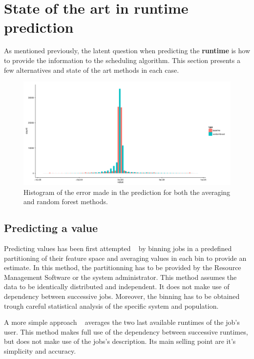 \documentclass{article}
\begin{document}
\section{State of the art in \textbf{runtime} prediction}

As mentioned previously, the latent question when predicting the \textbf{runtime} is how to provide the information to the scheduling algorithm. This section presents a few alternatives and state of the art methods in each case.

\begin{figure}[b]
  \centering
  \includegraphics[width=\textwidth]{../../truc.png}
  \caption{Histogram of the error made in the prediction for both the averaging and random forest methods.}
  \label{fig:ratio}
\end{figure}


\subsection{Predicting a value}
\label{sub:predicting_a_value}

Predicting values has been first attempted ~\cite{gibbons} by binning jobs in a predefined partitioning of their feature space and averaging values in each bin to provide an estimate. In this method, the partitionning has to be provided by the Resource Management Software or the system administrator. This method assumes the data to be identically distributed and independent. It does not make use of dependency between successive jobs. Moreover, the binning has to be obtained trough careful statistical analysis of the specific system and population.

A more simple approach ~\cite{tsafir} averages the two last available runtimes of the job's user.
This method makes full use of the dependency between successive runtimes, but does not make use of the jobs's description. Its main selling point are it's simplicity and accuracy.
\end{document}
